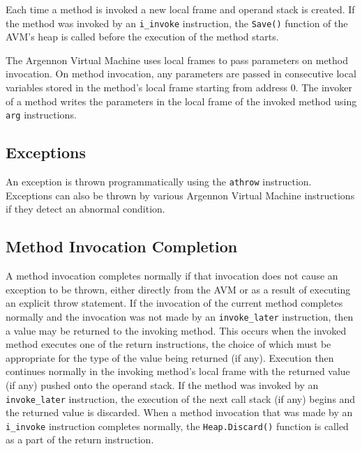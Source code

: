 
Each time a method is invoked a new local frame
and operand stack is created. If the method was invoked by an \texttt{i\_invoke} instruction,
the \texttt{Save()} function of the AVM's heap is called before the execution of the method starts.

The Argennon Virtual Machine uses local frames to pass parameters on
method invocation. On method invocation, any parameters are passed in consecutive local variables stored in the
method's local frame starting from address 0. The invoker of a method writes the parameters in the local frame
of the invoked method using \texttt{arg} instructions.


\subsection{Exceptions}\label{subsec:exceptions}

An exception is thrown programmatically using the \texttt{athrow} instruction. Exceptions can also be thrown by
various Argennon Virtual Machine instructions if they detect an abnormal condition.


\subsection{Method Invocation Completion}\label{subsec:method-invocation-completion}

A method invocation completes normally if that invocation does not cause an exception to be thrown, either
directly from the AVM or as a result of executing an explicit throw statement. If the invocation of the current
method completes normally and the invocation was not made by an \texttt{invoke\_later} instruction, then a value may be
returned to the invoking method. This occurs when the invoked method executes one of the return instructions, the
choice of which must be appropriate for the type of the value being returned (if any). Execution then continues
normally in the invoking method's local frame with the returned
value (if any) pushed onto the operand stack. If the method was invoked by an \texttt{invoke\_later} instruction,
the execution of the next call stack (if any) begins and the returned value
is discarded. When a method invocation that was made by
an \texttt{i\_invoke} instruction completes normally,
the \texttt{Heap.Discard()} function is called as a part of the return instruction.

